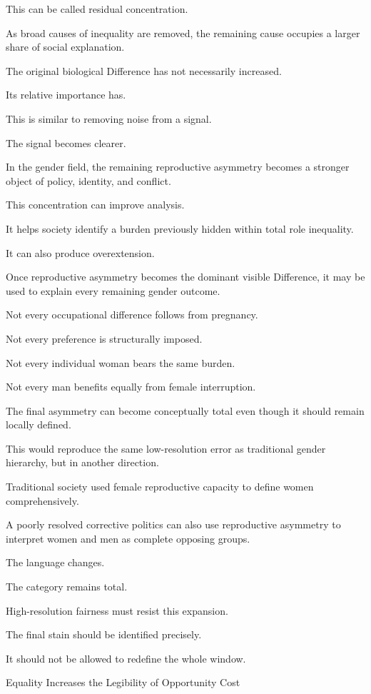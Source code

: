 This can be called residual concentration.

As broad causes of inequality are removed, the remaining cause occupies a larger share of social explanation.

The original biological Difference has not necessarily increased.

Its relative importance has.

This is similar to removing noise from a signal.

The signal becomes clearer.

In the gender field, the remaining reproductive asymmetry becomes a stronger object of policy, identity, and conflict.

This concentration can improve analysis.

It helps society identify a burden previously hidden within total role inequality.

It can also produce overextension.

Once reproductive asymmetry becomes the dominant visible Difference, it may be used to explain every remaining gender outcome.

Not every occupational difference follows from pregnancy.

Not every preference is structurally imposed.

Not every individual woman bears the same burden.

Not every man benefits equally from female interruption.

The final asymmetry can become conceptually total even though it should remain locally defined.

This would reproduce the same low-resolution error as traditional gender hierarchy, but in another direction.

Traditional society used female reproductive capacity to define women comprehensively.

A poorly resolved corrective politics can also use reproductive asymmetry to interpret women and men as complete opposing groups.

The language changes.

The category remains total.

High-resolution fairness must resist this expansion.

The final stain should be identified precisely.

It should not be allowed to redefine the whole window.

Equality Increases the Legibility of Opportunity Cost

